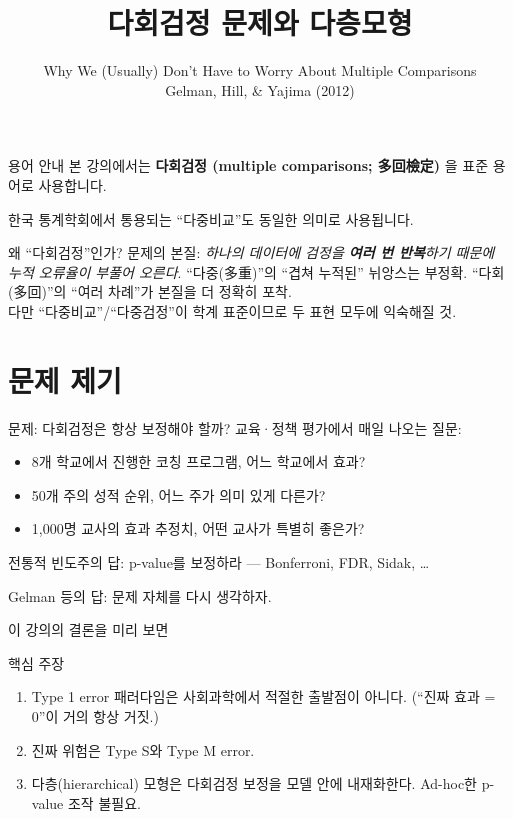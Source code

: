 \documentclass[10pt,aspectratio=169]{beamer}
\title{다회검정 문제와 다층모형}
\subtitle{Why We (Usually) Don't Have to Worry About Multiple Comparisons \\
         \footnotesize Gelman, Hill, \& Yajima (2012)}
\author{}
\date{}
\begin{document}
\begin{frame}\titlepage\end{frame}

\begin{frame}{용어 안내}
본 강의에서는 \alert{\textbf{다회검정 (multiple comparisons; 多回檢定)}} 을 표준 용어로 사용합니다.

\bigskip
한국 통계학회에서 통용되는 \alert{``다중비교''}도 동일한 의미로 사용됩니다.
\bigskip

\begin{block}{왜 ``다회검정''인가?}
문제의 본질: \emph{하나의 데이터에 검정을 \textbf{여러 번 반복}하기 때문에 누적 오류율이 부풀어 오른다}.
``다중(多重)''의 ``겹쳐 누적된'' 뉘앙스는 부정확. ``다회(多回)''의 ``여러 차례''가 본질을 더 정확히 포착.\\
다만 ``다중비교''/``다중검정''이 학계 표준이므로 두 표현 모두에 익숙해질 것.
\end{block}
\end{frame}

\section{문제 제기}

\begin{frame}{문제: 다회검정은 항상 보정해야 할까?}
교육·정책 평가에서 매일 나오는 질문:
\begin{itemize}
  \item 8개 학교에서 진행한 코칭 프로그램, 어느 학교에서 효과?
  \item 50개 주의 성적 순위, 어느 주가 의미 있게 다른가?
  \item 1{,}000명 교사의 효과 추정치, 어떤 교사가 특별히 좋은가?
\end{itemize}
\bigskip

전통적 빈도주의 답: \alert{p-value를 보정}하라 --- Bonferroni, FDR, Sidak, \ldots
\bigskip

Gelman 등의 답: \alert{문제 자체를 다시 생각}하자.
\end{frame}

\begin{frame}{이 강의의 결론을 미리 보면}
\begin{block}{핵심 주장}
\begin{enumerate}
  \item Type 1 error 패러다임은 사회과학에서 적절한 출발점이 아니다.
        (``진짜 효과 = 0''이 거의 항상 거짓.)
  \item 진짜 위험은 \alert{Type S}와 \alert{Type M} error.
  \item 다층(hierarchical) 모형은 다회검정 보정을 \alert{모델 안에 내재화}한다.
        Ad-hoc한 p-value 조작 불필요.
\end{enumerate}
\end{block}
\end{frame}
\end{document}
